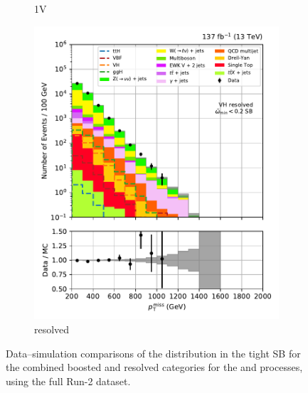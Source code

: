 \begin{figure}[htbp]
\begin{subfigure}[b]{0.24\textwidth}
        \caption{\VH 1V}
    \end{subfigure}
    \hfill
    \begin{subfigure}[b]{0.24\textwidth}
        \includegraphics[width=\textwidth]{figures/region_plots/full_Run2/sideband_3/VH_resolved.pdf}
        \caption{\VH resolved}
    \end{subfigure}
    \caption[Data--simulation comparisons of the \ptmiss distribution in the tight \omegaTilde sideband for the combined boosted and resolved categories for the \ttH and \VH processes, using the full Run-2 dataset]{Data--simulation comparisons of the \ptmiss distribution in the tight \omegaTilde \gls{SB} for the combined boosted and resolved categories for the \ttH and \VH processes, using the full Run-2 dataset.}
    \label{fig:htoinv_sb_yields_comb2016to18_tight_minOmegaTilde}
\end{figure}

